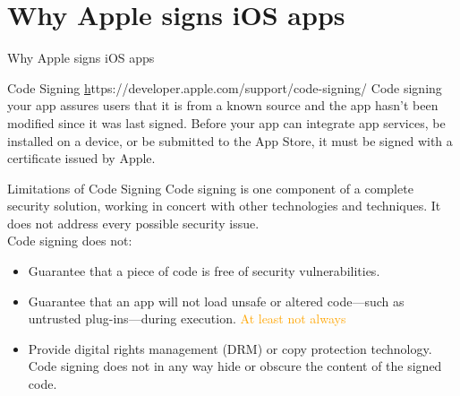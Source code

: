 \documentclass{beamer}
\begin{document}
\section{Why Apple signs iOS apps}
\begin{frame}{Why Apple signs iOS apps}\footnotesize 
    \begin{block}{Code Signing\,\,\small\href{https://developer.apple.com/support/code-signing/}https://developer.apple.com/support/code-signing/}
        Code signing your app assures users that it is from a known source and the app hasn’t been modified since it was last signed. Before your app can integrate app services, be installed on a device, or be submitted to the App Store, it must be signed with a certificate issued by Apple. 
    \end{block}
    \begin{block}{Limitations of Code Signing}
        Code signing is one component of a complete security solution, working in concert with other technologies and techniques. It does not address every possible security issue.\\\vspace{1mm}
        Code signing does not:
        \begin{itemize}
            \item Guarantee that a piece of code is free of security vulnerabilities.
            \item Guarantee that an app will not load unsafe or altered code—such as untrusted plug-ins—during execution. {\tiny \textcolor{orange}{At least not always}}
            \item Provide digital rights management (DRM) or copy protection technology.\\Code signing does not in any way hide or obscure the content of the signed code.
        \end{itemize}
    \end{block}
\end{frame}
\end{document}

